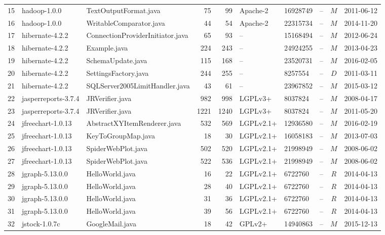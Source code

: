 \documentclass{sig-alternate-05-2015}
\begin{document}
\begin{table}
{\begin{tabular}{r|l|p{4.5cm}|r|r|l|l|l|c|l}
			15 & hadoop-1.0.0  & TextOutputFormat.java  & 75 & 99 & Apache-2 & 16928749 & -- & $M$  & 2011-06-12 \\
			16 & hadoop-1.0.0  & WritableComparator.java  & 44 & 54 & Apache-2 & 22315734 & -- & $M$  & 2014-11-20 \\
			17 & hibernate-4.2.2  & ConnectionProviderInitiator.java  & 65 & 93 & -- & 15168494 & -- & $M$  & 2012-06-24 \\
			18 & hibernate-4.2.2  & Example.java  & 224 & 243 & -- & 24924255 & -- & $M$  & 2013-04-23 \\
			19 & hibernate-4.2.2  & SchemaUpdate.java  & 115 & 168 & -- & 23520731 & -- & $M$  & 2016-02-05 \\
			20 & hibernate-4.2.2  & SettingsFactory.java  & 244 & 255 & -- & 8257554 & -- & $D$  & 2011-03-11 \\
			21 & hibernate-4.2.2  & SQLServer2005LimitHandler.java  & 43 & 61 & -- & 23967852 & -- & $M$  & 2015-03-12 \\
			22 & jasperreports-3.7.4  & JRVerifier.java  & 982 & 998 & LGPLv3+ & 8037824 & -- & $M$  & 2008-04-17 \\
			23 & jasperreports-3.7.4  & JRVerifier.java  & 1221 & 1240 & LGPLv3+ & 8037824 & -- & $M$  & 2011-05-20 \\
			24 & jfreechart-1.0.13  & AbstractXYItemRenderer.java  & 532 & 569 & LGPLv2.1+ & 12936580 & -- & $M$  & 2016-02-19 \\
			25 & jfreechart-1.0.13  & KeyToGroupMap.java  & 18 & 30 & LGPLv2.1+ & 16058183 & -- & $M$  & 2013-07-03 \\
			26 & jfreechart-1.0.13  & SpiderWebPlot.java  & 502 & 520 & LGPLv2.1+ & 21998949 & -- & $M$  & 2008-06-02 \\
			27 & jfreechart-1.0.13  & SpiderWebPlot.java  & 522 & 536 & LGPLv2.1+ & 21998949 & -- & $M$  & 2008-06-02 \\
			28 & jgraph-5.13.0.0  & HelloWorld.java  & 16 & 22 & LGPLv2.1+ & 6722760 & -- & $R$  & 2014-04-13 \\
			29 & jgraph-5.13.0.0  & HelloWorld.java  & 28 & 40 & LGPLv2.1+ & 6722760 & -- & $R$  & 2014-04-13 \\
			30 & jgraph-5.13.0.0  & HelloWorld.java  & 31 & 36 & LGPLv2.1+ & 6722760 & -- & $R$  & 2014-04-13 \\
			31 & jgraph-5.13.0.0  & HelloWorld.java  & 39 & 56 & LGPLv2.1+ & 6722760 & -- & $R$  & 2014-04-13 \\
			32 & jstock-1.0.7c  & GoogleMail.java  & 18 & 42 & GPLv2+ & 14940863 & -- & $M$  & 2015-12-13 \\

\end{tabular}}
\end{table}
\end{document}
